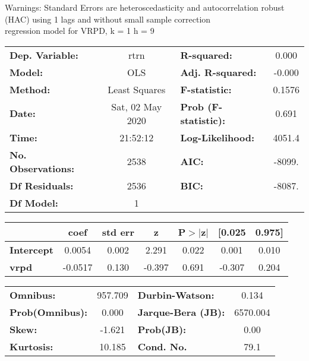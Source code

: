 Warnings: \newline
 [1] Standard Errors are heteroscedasticity and autocorrelation robust (HAC) using 1 lags and without small sample correction\\ 

regression model for VRPD, k = 1 h = 9\begin{center}
\begin{tabular}{lclc}
\toprule
\textbf{Dep. Variable:}    &       rtrn       & \textbf{  R-squared:         } &     0.000   \\
\textbf{Model:}            &       OLS        & \textbf{  Adj. R-squared:    } &    -0.000   \\
\textbf{Method:}           &  Least Squares   & \textbf{  F-statistic:       } &    0.1576   \\
\textbf{Date:}             & Sat, 02 May 2020 & \textbf{  Prob (F-statistic):} &    0.691    \\
\textbf{Time:}             &     21:52:12     & \textbf{  Log-Likelihood:    } &    4051.4   \\
\textbf{No. Observations:} &        2538      & \textbf{  AIC:               } &    -8099.   \\
\textbf{Df Residuals:}     &        2536      & \textbf{  BIC:               } &    -8087.   \\
\textbf{Df Model:}         &           1      & \textbf{                     } &             \\
\bottomrule
\end{tabular}
\begin{tabular}{lcccccc}
                   & \textbf{coef} & \textbf{std err} & \textbf{z} & \textbf{P$> |$z$|$} & \textbf{[0.025} & \textbf{0.975]}  \\
\midrule
\textbf{Intercept} &       0.0054  &        0.002     &     2.291  &         0.022        &        0.001    &        0.010     \\
\textbf{vrpd}      &      -0.0517  &        0.130     &    -0.397  &         0.691        &       -0.307    &        0.204     \\
\bottomrule
\end{tabular}
\begin{tabular}{lclc}
\textbf{Omnibus:}       & 957.709 & \textbf{  Durbin-Watson:     } &    0.134  \\
\textbf{Prob(Omnibus):} &   0.000 & \textbf{  Jarque-Bera (JB):  } & 6570.004  \\
\textbf{Skew:}          &  -1.621 & \textbf{  Prob(JB):          } &     0.00  \\
\textbf{Kurtosis:}      &  10.185 & \textbf{  Cond. No.          } &     79.1  \\
\bottomrule
\end{tabular}
\end{center}

